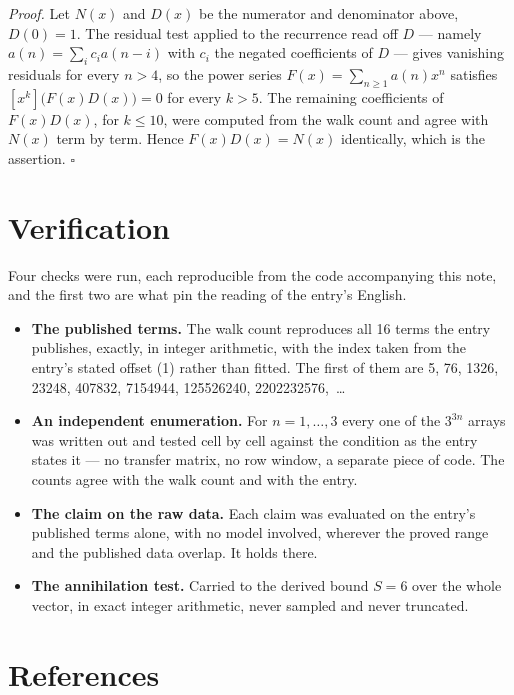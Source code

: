 \documentclass[11pt]{article}
\theoremstyle{definition}
\begin{document}
{\itshape Proof.} Let $N(x)$ and $D(x)$ be the numerator and denominator above, $D(0)=1$. The residual test applied to the recurrence read off $D$ --- namely $a(n) = \sum_i c_i a(n-i)$ with $c_i$ the negated coefficients of $D$ --- gives vanishing residuals for every $n > 4$, so the power series $F(x)=\sum_{n\ge 1}a(n)x^n$ satisfies $[x^k]\bigl(F(x)D(x)\bigr) = 0$ for every $k > 5$. The remaining coefficients of $F(x)D(x)$, for $k \le 10$, were computed from the walk count and agree with $N(x)$ term by term. Hence $F(x)D(x) = N(x)$ identically, which is the assertion. $\square$

\section{Verification}

Four checks were run, each reproducible from the code accompanying this note, and the first two are what pin the reading of the entry's English.

\begin{itemize}

\item {\bfseries The published terms.} The walk count reproduces all 16 terms the entry publishes, exactly, in integer arithmetic, with the index taken from the entry's stated offset (1) rather than fitted. The first of them are 5, 76, 1326, 23248, 407832, 7154944, 125526240, 2202232576,~\dots

\item {\bfseries An independent enumeration.} For $n = 1,\dots,3$ every one of the $3^{3n}$ arrays was written out and tested cell by cell against the condition as the entry states it --- no transfer matrix, no row window, a separate piece of code. The counts agree with the walk count and with the entry.

\item {\bfseries The claim on the raw data.} Each claim was evaluated on the entry's published terms alone, with no model involved, wherever the proved range and the published data overlap. It holds there.

\item {\bfseries The annihilation test.} Carried to the derived bound $S = 6$ over the whole vector, in exact integer arithmetic, never sampled and never truncated.

\end{itemize}

\section{References}
\end{document}
